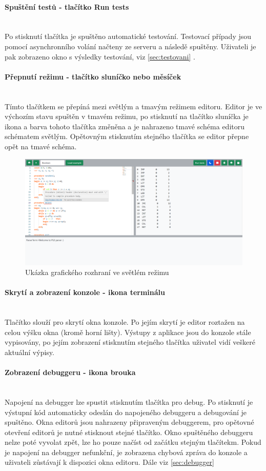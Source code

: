 \documentclass[12pt, letterpaper]{article}
\newcommand{\chapterRef}[1]{\ref{#1} \nameref{#1}}
\newcommand{\myparagraph}[1]{\paragraph{#1}\mbox{}\\}
\begin{document}
\myparagraph{Spuštění testů - tlačítko Run tests}\label{sec:testovaniTlacitko}
Po stisknutí tlačítka je spuštěno automatické testování. Testovací případy jsou pomocí asynchronního volání načteny ze serveru a následě spuštěny. Uživateli je pak zobrazeno okno s výsledky testování, viz \chapterRef{sec:testovani}.

\myparagraph{Přepnutí režimu - tlačítko sluníčko nebo měsíček}
Tímto tlačítkem se přepíná mezi světlým a tmavým režimem editoru. Editor je ve výchozím stavu spuštěn v tmavém režimu, po stisknutí na tlačítko sluníčka je ikona a barva tohoto tlačítka změněna a je nahrazeno tmavé schéma editoru schématem světlým. Opětovným stisknutím stejného tlačítka se editor přepne opět na tmavé schéma.
\begin{figure}[H]
	\centering
	\includegraphics[width=\linewidth]{img/gui_light.png}
	\caption{Ukázka grafického rozhraní ve světlém režimu}
	\label{fig:GUILight}
\end{figure}

\myparagraph{Skrytí a zobrazení konzole - ikona terminálu}
Tlačítko slouží pro skrytí okna konzole. Po jejím skrytí je editor roztažen na celou výšku okna (kromě horní lišty). Výstupy z aplikace jsou do konzole stále vypisovány, po jejím zobrazení stisknutím stejného tlačítka uživatel vidí veškeré aktuální výpisy.

\myparagraph{Zobrazení debuggeru - ikona brouka}
Napojení na debugger lze spustit stisknutím tlačítka pro debug. Po stisknutí je výstupní kód automaticky odeslán do napojeného debuggeru a debugování je spuštěno. Okna editorů jsou nahrazeny připraveným debuggerem, pro opětovné otevření editorů je nutné stisknout stejné tlačítko. Okno spuštěného debuggeru nelze poté vyvolat zpět, lze ho pouze načíst od začátku stejným tlačítekm. Pokud je napojení na debugger nefunkční, je zobrazena chybová zpráva do konzole a uživateli zůstávají k dispozici okna editoru. Dále viz \chapterRef{sec:debugger}
\end{document}
